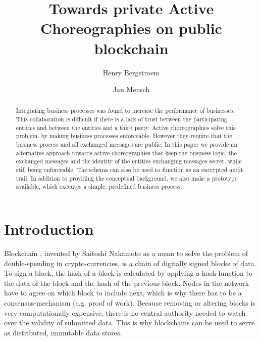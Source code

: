 \documentclass[runningheads]{llncs}
\begin{document}
%
\title{Towards private Active Choreographies on public blockchain}
%
%
\author{Henry Bergstroem \and
Jan Mensch}
%
%


%
\maketitle              %
%
\begin{abstract}


Integrating business processes was found to increase the performance of businesses. This collaboration is difficult if there is a lack of trust between the participating entities and between the entities and a third party. Active choreographies solve this problem, by making business processes enforceable. However they require that the business process and all exchanged messages are public. In this paper we provide an alternative approach towards active choreographies that keep the business logic, the exchanged messages and the identity of the entities exchanging messages secret, while still being enforceable. The schema can also be used to function as an encrypted audit trail. In addition to providing the conceptual background, we also make a prototype available, which executes a simple, predefined business process.


\end{abstract}



\section{Introduction} \label{intro}

Blockchain \cite{nakamoto2008bitcoin}, invented by Saitoshi Nakamoto as a mean to solve the problem of double-spending in crypto-currencies, is a chain of digitally signed blocks of data. To sign a block, the hash of a block is calculated by applying a hash-function to the data of the block and the hash of the previous block. Nodes in the network have to agree on which block to include next, which is why there has to be a consensus-mechanism (e.g. proof of work). Because removing or altering blocks is very computationally expensive, there is no central authority needed to watch over the validity of submitted data. This is why blockchains can be used to serve as distributed, immutable data stores.
\end{document}
